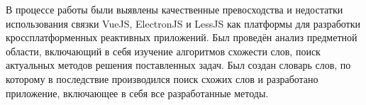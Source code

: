 \conclusion

В процессе работы были выявлены качественные превосходства и недостатки использования связки VueJS, ElectronJS и LessJS как платформы для разработки кроссплатформенных реактивных приложений. Был проведён анализ предметной области, включающий в себя изучение алгоритмов схожести слов, поиск актуальных методов решения поставленных задач. Был создан словарь слов, по которому в последствие производился поиск схожих слов и разработано приложение, включающее в себя все разработанные методы.